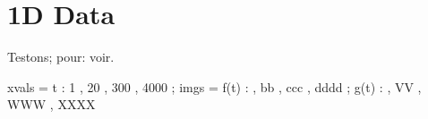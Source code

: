 \documentclass[12pt]{article}
\begin{document}


\section{1D Data}

Testons; pour: voir.

\begin{functable}
    xvals =    t : 1 , 20 , 300 , 4000 ;
    imgs  = f(t) :  , bb , ccc , dddd ;
            g(t) :  , VV , WWW , XXXX
\end{functable}


\end{document}
